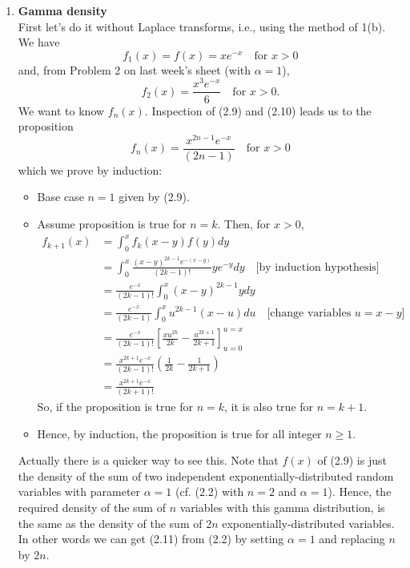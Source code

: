 \documentclass[11pt,a4paper]{article}
\begin{document}
\begin{enumerate}
    \item \textbf{Gamma density}\\
    First let's do it without Laplace transforms, i.e., using the method of 1(b). We have
    \begin{equation}\tag{2.9}
      f_1(x) = f(x) = xe^{-x}\quad \text{for $x > 0$}
    \end{equation}
    and, from Problem 2 on last week's sheet (with $\alpha = 1$),
    \begin{equation}\tag{2.10}
      f_2(x) = \frac{x^3e^{-x}}{6}\quad \text{for $x > 0$}.
    \end{equation}
    We want to know $f_n(x)$. Inspection of (2.9) and (2.10) leads us to the proposition
    \begin{equation}\tag{2.11}
      f_n(x) = \frac{x^{2n - 1}e^{-x}}{(2n - 1)}\quad \text{for $x > 0$}
    \end{equation}
    which we prove by induction:
    \begin{itemize}
      \item Base case $n = 1$ given by (2.9).
      \item Assume proposition is true for $n = k$. Then, for $x > 0$,
      \begin{align*}
        f_{k + 1}(x)
        &= \int_0^xf_k(x - y)f(y)dy\\
        &= \int_0^x\frac{(x - y)^{2k - 1}e^{-(x - y)}}{(2k - 1)!}ye^{-y}dy\quad \text{[by induction hypothesis]}\\
        &= \frac{e^{-x}}{(2k - 1)!}\int_0^x(x - y)^{2k - 1}ydy\\
        &= \frac{e^{-x}}{(2k - 1)}\int_0^xu^{2k - 1}(x - u)du\quad \text{[change variables $u = x - y$]}\\
        &= \frac{e^{-x}}{(2k - 1)!}\left[\frac{xu^{2k}}{2k} - \frac{u^{2k + 1}}{2k + 1}\right]_{u = 0}^{u = x}\\
        &= \frac{x^{2k + 1}e^{-x}}{(2k - 1)!}\left(\frac{1}{2k} - \frac{1}{2k + 1}\right)\\
        &= \frac{x^{2k + 1}e^{-x}}{(2k + 1)!}
      \end{align*}
      So, if the proposition is true for $n = k$, it is also true for $n = k + 1$.
      \item Hence, by induction, the proposition is true for all integer $n \geq 1$.
    \end{itemize}
    Actually there is a quicker way to see this. Note that $f(x)$ of (2.9) is just the density of the sum of two independent exponentially-distributed random variables with parameter $\alpha = 1$ (cf. (2.2) with $n = 2$ and $\alpha = 1$). Hence, the required density of the sum of $n$ variables with this gamma distribution, is the same as the density of the sum of $2n$ exponentially-distributed variables. In other words we can get (2.11) from (2.2) by setting $\alpha = 1$ and replacing $n$ by $2n$.\par

\end{enumerate}
\end{document}

